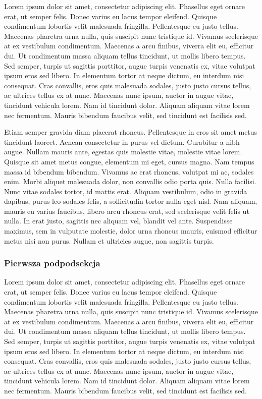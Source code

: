 Lorem ipsum dolor sit amet, consectetur adipiscing elit. Phasellus eget ornare
erat, ut semper felis. Donec varius eu lacus tempor eleifend. Quisque
condimentum lobortis velit malesuada fringilla. Pellentesque eu justo tellus.
Maecenas pharetra urna nulla, quis suscipit nunc tristique id. Vivamus
scelerisque at ex vestibulum condimentum. Maecenas a arcu finibus, viverra elit
eu, efficitur dui. Ut condimentum massa aliquam tellus tincidunt, ut mollis
libero tempus. Sed semper, turpis ut sagittis porttitor, augue turpis venenatis
ex, vitae volutpat ipsum eros sed libero. In elementum tortor at neque dictum,
eu interdum nisi consequat. Cras convallis, eros quis malesuada sodales, justo
justo cursus tellus, ac ultrices tellus ex at nunc. Maecenas nunc ipsum, auctor
in augue vitae, tincidunt vehicula lorem. Nam id tincidunt dolor. Aliquam
aliquam vitae lorem nec fermentum. Mauris bibendum faucibus velit, sed tincidunt
est facilisis sed.

Etiam semper gravida diam placerat rhoncus. Pellentesque in eros sit amet metus
tincidunt laoreet. Aenean consectetur in purus vel dictum. Curabitur a nibh
augue. Nullam mauris ante, egestas quis molestie vitae, molestie vitae lorem.
Quisque sit amet metus congue, elementum mi eget, cursus magna. Nam tempus massa
id bibendum bibendum. Vivamus ac erat rhoncus, volutpat mi ac, sodales enim.
Morbi aliquet malesuada dolor, non convallis odio porta quis. Nulla facilisi.
Nunc vitae sodales tortor, id mattis erat. Aliquam vestibulum, odio in gravida
dapibus, purus leo sodales felis, a sollicitudin tortor nulla eget nisl. Nam
aliquam, mauris eu varius faucibus, libero arcu rhoncus erat, sed scelerisque
velit felis ut nulla. In erat justo, sagittis nec aliquam vel, blandit vel
ante. Suspendisse maximus, sem in vulputate molestie, dolor urna rhoncus
mauris, euismod efficitur metus nisi non purus. Nullam et ultricies augue, non
sagittis turpis.

\subsubsection{Pierwsza podpodsekcja}

Lorem ipsum dolor sit amet, consectetur adipiscing elit. Phasellus eget ornare
erat, ut semper felis. Donec varius eu lacus tempor eleifend. Quisque
condimentum lobortis velit malesuada fringilla. Pellentesque eu justo tellus.
Maecenas pharetra urna nulla, quis suscipit nunc tristique id. Vivamus
scelerisque at ex vestibulum condimentum. Maecenas a arcu finibus, viverra elit
eu, efficitur dui. Ut condimentum massa aliquam tellus tincidunt, ut mollis
libero tempus. Sed semper, turpis ut sagittis porttitor, augue turpis venenatis
ex, vitae volutpat ipsum eros sed libero. In elementum tortor at neque dictum,
eu interdum nisi consequat. Cras convallis, eros quis malesuada sodales, justo
justo cursus tellus, ac ultrices tellus ex at nunc. Maecenas nunc ipsum, auctor
in augue vitae, tincidunt vehicula lorem. Nam id tincidunt dolor. Aliquam
aliquam vitae lorem nec fermentum. Mauris bibendum faucibus velit, sed tincidunt
est facilisis sed.

